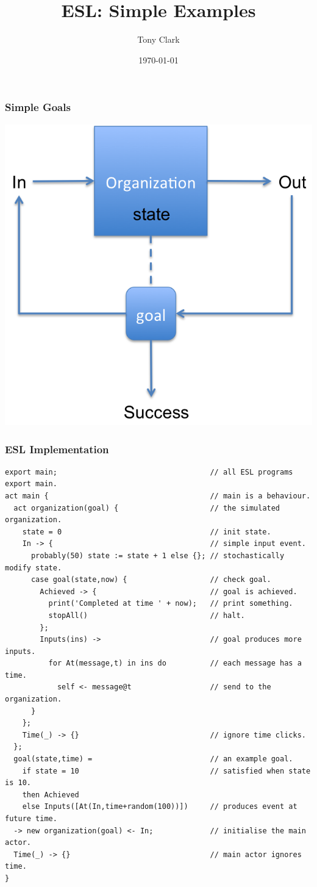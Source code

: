\documentclass{beamer}
\title{ESL: Simple Examples}
\author{Tony Clark}
\date{\today}
\begin{document}
\frame{\titlepage}

\frame
{
  \frametitle{Simple Goals}
  \centering
  \includegraphics[scale=0.7]{goals}  
}

\begin{frame}[fragile]
  \frametitle{ESL Implementation}
\begin{lstlisting}
export main;                                   // all ESL programs export main.
act main {                                     // main is a behaviour.
  act organization(goal) {                     // the simulated organization.
    state = 0                                  // init state.
    In -> {                                    // simple input event.
      probably(50) state := state + 1 else {}; // stochastically modify state.
      case goal(state,now) {                   // check goal.
        Achieved -> {                          // goal is achieved.
          print('Completed at time ' + now);   // print something.
          stopAll()                            // halt.
        };
        Inputs(ins) ->                         // goal produces more inputs.
          for At(message,t) in ins do          // each message has a time.
            self <- message@t                  // send to the organization.
      }
    };     
    Time(_) -> {}                              // ignore time clicks.     
  };
  goal(state,time) =                           // an example goal.
    if state = 10                              // satisfied when state is 10.
    then Achieved                              
    else Inputs([At(In,time+random(100))])     // produces event at future time.
  -> new organization(goal) <- In;             // initialise the main actor.
  Time(_) -> {}                                // main actor ignores time.
}\end{lstlisting}
\end{frame}
\end{document}
